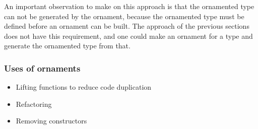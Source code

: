 An important observation to make on this approach is that the
ornamented type can not be generated by the ornament, because the
ornamented type must be defined before an ornament can be built.
The approach of the previous sections does not have this requirement,
and one could make an ornament for a type and generate the ornamented
type from that.

\subsubsection{Uses of ornaments}


\begin{itemize}
\item Lifting functions to reduce code duplication
\item Refactoring
\item Removing constructors
\end{itemize}

\cite{williams14}
